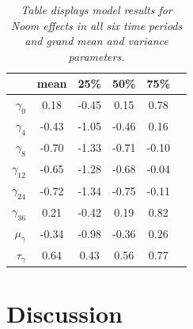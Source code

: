 \documentclass{article}
\begin{document}
\begin{table}[H]
\centering
\begin{tabular}{r c c c c c}
  \hline
 & mean & 25\% & 50\% & 75\%\\ 
  \hline
  $\gamma_0$ & 0.18 & -0.45 & 0.15 & 0.78  \\ 
  $\gamma_4$ & -0.43 & -1.05 & -0.46 & 0.16 \\ 
  $\gamma_8$ & -0.70 & -1.33 & -0.71 & -0.10 \\  
  $\gamma_{12}$ & -0.65 & -1.28 & -0.68 & -0.04 \\  
  $\gamma_{24}$ & -0.72 & -1.34 & -0.75 & -0.11 \\  
  $\gamma_{36}$ & 0.21 & -0.42 & 0.19 & 0.82 \\ 
  \hline \hline
  $\mu_{\gamma}$ & -0.34 & -0.98 & -0.36 & 0.26 \\ 
  $\tau_{\gamma}$ & 0.64 & 0.43 & 0.56 & 0.77 \\ 
   \hline
\end{tabular}
\caption{\emph{Table displays model results for Noom effects in all six time periods and grand mean and variance parameters.}}
\end{table}

\section*{Discussion}
\end{document}
